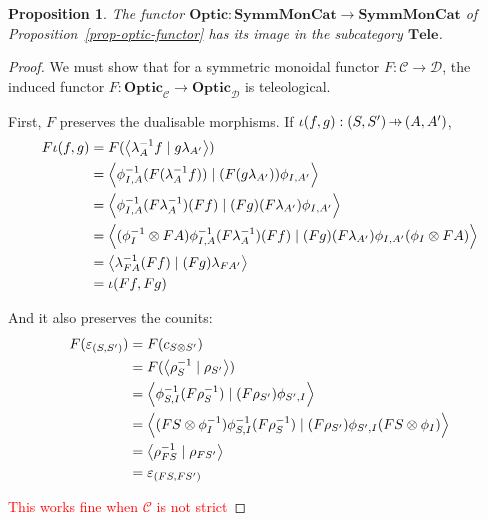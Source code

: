 \documentclass[11pt,a4paper]{article}
\theoremstyle{plain}
\newtheorem{proposition}[theorem]{Proposition}
\theoremstyle{definition}
\newcommand{\C}{\mathscr{C}}
\newcommand{\D}{\mathscr{D}}
\newcommand{\SymmMonCat}{\mathbf{SymmMonCat}}
\newcommand{\Tele}{\mathbf{Tele}}
\newcommand{\Optic}{\mathbf{Optic}}
\newcommand{\rep}[2]{{\ensuremath \left\langle #1 \mid #2 \right\rangle}}
\newcommand{\hto}{\ensuremath{\,\mathaccent\shortmid\rightarrow\,}}
\newcommand{\todo}[1]{\textcolor{red}{\small #1}}
\begin{document}

\begin{proposition}
  The functor $\Optic : \SymmMonCat \to \SymmMonCat$ of Proposition~\ref{prop-optic-functor} has its image in the subcategory $\Tele$.
\end{proposition}
\begin{proof}
  We must show that for a symmetric monoidal functor $F : \C \to \D$, the induced functor $F : \Optic_\C \to \Optic_\D$ is teleological.

  First, $F$ preserves the dualisable morphisms. If $\iota(f, g) : (S, S') \hto (A, A')$,
  \begin{align*}
    F\iota(f, g)
    &= F(\rep{\lambda_A^{-1} f}{g \lambda_{A'}}) \\
    &= \rep{\phi^{-1}_{I,A} (F(\lambda_A^{-1} f))}{(F(g \lambda_{A'})) \phi_{I,A'}} \\
    &= \rep{\phi^{-1}_{I,A} (F\lambda_A^{-1}) (Ff)}{(Fg)(F \lambda_{A'}) \phi_{I,A'}} \\
    &= \rep{(\phi^{-1}_I \otimes FA) \phi^{-1}_{I,A} (F\lambda_A^{-1}) (Ff)}{(Fg)(F \lambda_{A'}) \phi_{I,A'} (\phi_I \otimes FA)} \\
    &= \rep{\lambda_{FA}^{-1} (Ff)}{(Fg)\lambda_{FA'}} \\
    &= \iota(Ff, Fg)
  \end{align*}

  And it also preserves the counits:
  \begin{align*}
    F(\varepsilon_{(S, S')})
    &= F(c_{S \otimes S'}) \\
    &= F(\rep{\rho_S^{-1}}{\rho_{S'}}) \\
    &= \rep{\phi^{-1}_{S,I} (F \rho_S^{-1})}{(F \rho_{S'}) \phi_{S',I}} \\
    &= \rep{(FS \otimes \phi_I^{-1}) \phi^{-1}_{S,I} (F \rho_S^{-1})}{(F \rho_{S'}) \phi_{S',I} (FS \otimes \phi_I)} \\
    &= \rep{\rho_{FS}^{-1}}{\rho_{FS'} } \\
    &= \varepsilon_{(FS, FS')}
  \end{align*}

  \todo{This works fine when $\C$ is not strict}
\end{proof}
\end{document}
